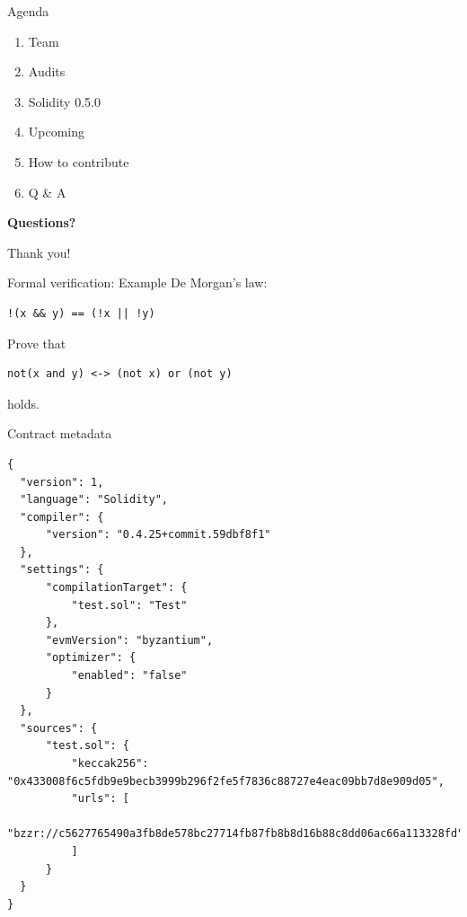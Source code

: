 \documentclass[aspectratio=169,10pt]{beamer}
\begin{document}
\begin{frame}{Agenda}
	\begin{enumerate}
  \item Team
  \item Audits
	\item Solidity 0.5.0
	\item Upcoming
	\item How to contribute
	\item \alert{Q \& A}
	\end{enumerate}
\end{frame}

\begin{frame}{}
  \centering
  \textbf{\huge{Questions?}}
\end{frame}

\begin{frame}[standout]
\centering
  Thank you!
\end{frame}

\appendix

\begin{frame}[fragile]{Formal verification: Example}
  De Morgan's law:
    \begin{mdframed}
    \begin{lstlisting}[language=Solidity]
  !(x && y) == (!x || !y)
    \end{lstlisting}
    \end{mdframed}
  Prove that
    \begin{mdframed}
    \begin{lstlisting}[language=Solidity]
  not(x and y) <-> (not x) or (not y)
    \end{lstlisting}
    \end{mdframed}
  holds.
\end{frame}

\begin{frame}[fragile]{Contract metadata}
  \begin{mdframed}
    \begin{lstlisting}[language=Solidity, basicstyle=\color{white}\tiny]
{
  "version": 1,
  "language": "Solidity",
  "compiler": {
      "version": "0.4.25+commit.59dbf8f1"
  },
  "settings": {
      "compilationTarget": {
          "test.sol": "Test"
      },
      "evmVersion": "byzantium",
      "optimizer": {
          "enabled": "false"
      }
  },
  "sources": {
      "test.sol": {
          "keccak256": "0x433008f6c5fdb9e9becb3999b296f2fe5f7836c88727e4eac09bb7d8e909d05",
          "urls": [
              "bzzr://c5627765490a3fb8de578bc27714fb87fb8b8d16b88c8dd06ac66a113328fd"
          ]
      }
  }
}    
    \end{lstlisting}
    \end{mdframed}
\end{frame}
\end{document}
